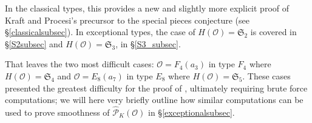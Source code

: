 \documentclass{amsart}
\theoremstyle{definition}
\newcommand{\C}{\mathbb{C}}
\newcommand{\covP}{\widetilde{\mathcal{P}}}
\newcommand{\g}{\mathfrak{g}}
\newcommand{\frakS}{\mathfrak{S}}
\newcommand{\0}{\mathcal{O}}
\begin{document}
In the classical types, this provides a new and slightly more explicit proof of Kraft and Procesi's precursor to the special pieces conjecture (see \S\ref{classicalsubsec}).  In exceptional types, the case of $H(\0)=\mathfrak{S}_2$ is covered in \S\ref{S2subsec}
and $H(\0)= \frakS_3$, in \S\ref{S3_subsec}.  


That leaves the two most difficult cases: 
$\0=F_4(a_3)$ in type $F_4$ where $H(\0)=\mathfrak{S}_4$ and 
$\0=E_8(a_7)$ in type $E_8$ where $H(\0)=\mathfrak{S}_5$.
These cases presented the greatest difficulty for the proof of \cite[Main Theorem]{FJLS23}, ultimately requiring brute force computations; we will here very briefly outline how similar computations can be used to prove smoothness of $\hat{\mathcal P}_K(\0)$ in \S\ref{exceptionalsubsec}.
\end{document}
